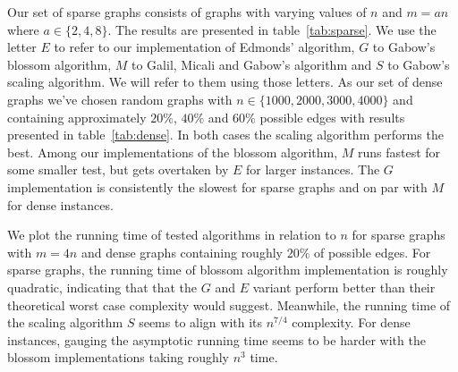 Our set of sparse graphs consists of graphs with varying values of $n$ and $m = a n$ where $a \in \{2, 4, 8 \}$. The results are presented in table~\ref{tab:sparse}. We use the letter $E$ to refer to our implementation of Edmonds' algorithm, $G$ to Gabow's blossom algorithm, $M$ to Galil, Micali and Gabow's algorithm and $S$ to Gabow's scaling algorithm. We will refer to them using those letters. 
As our set of dense graphs we've chosen random graphs with $n \in \{ 1000, 2000, 3000, 4000 \}$ and containing approximately $20\%$, $40\%$ and $60\%$ possible edges with results presented in table~\ref{tab:dense}. In both cases the scaling algorithm performs the best. Among our implementations of the blossom algorithm, $M$ runs fastest for some smaller test, but gets overtaken by $E$ for larger instances. The $G$ implementation is consistently the slowest for sparse graphs and on par with $M$ for dense instances.

We plot the running time of tested algorithms in relation to $n$ for sparse graphs with $m = 4 n$ and dense graphs containing roughly $20\%$ of possible edges. For sparse graphs, the running time of blossom algorithm implementation is roughly quadratic, indicating that that the $G$ and $E$ variant perform better than their theoretical worst case complexity would suggest. Meanwhile, the running time of the scaling algorithm $S$ seems to align with its $n^{7/4}$ complexity. For dense instances, gauging the asymptotic running time seems to be harder with the blossom implementations taking roughly $n^3$ time. 


